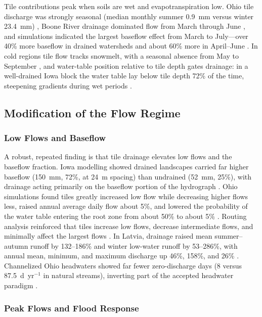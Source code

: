 Tile contributions peak when soils are wet and evapotranspiration low. Ohio tile discharge was strongly seasonal (median monthly summer 0.9~mm versus winter 23.4~mm) \parencite{King2014}, Boone River drainage dominated flow from March through June \parencite{Schilling2019}, and simulations indicated the largest baseflow effect from March to July---over 40\% more baseflow in drained watersheds and about 60\% more in April--June \parencite{Schilling2008}. In cold regions tile flow tracks snowmelt, with a seasonal absence from May to September \parencite{Kompanizare2024}, and water-table position relative to tile depth gates drainage: in a well-drained Iowa block the water table lay below tile depth 72\% of the time, steepening gradients during wet periods \parencite{Logsdon2020}.

\subsection{Modification of the Flow Regime}

\subsubsection{Low Flows and Baseflow}

A robust, repeated finding is that tile drainage elevates low flows and the baseflow fraction. Iowa modelling showed drained landscapes carried far higher baseflow (150~mm, 72\%, at 24~m spacing) than undrained (52~mm, 25\%), with drainage acting primarily on the baseflow portion of the hydrograph \parencite{Schilling2008}. Ohio simulations found tiles greatly increased low flow while decreasing higher flows less, raised annual average daily flow about 5\%, and lowered the probability of the water table entering the root zone from about 50\% to about 5\% \parencite{Rathore2025}. Routing analysis reinforced that tiles increase low flows, decrease intermediate flows, and minimally affect the largest flows \parencite{Sloan2017}. In Latvia, drainage raised mean summer--autumn runoff by 132--186\% and winter low-water runoff by 53--286\%, with annual mean, minimum, and maximum discharge up 46\%, 158\%, and 26\% \parencite{Apsite2017}. Channelized Ohio headwaters showed far fewer zero-discharge days (8 versus 87.5~d~yr$^{-1}$ in natural streams), inverting part of the accepted headwater paradigm \parencite{King2009}.

\subsubsection{Peak Flows and Flood Response}

